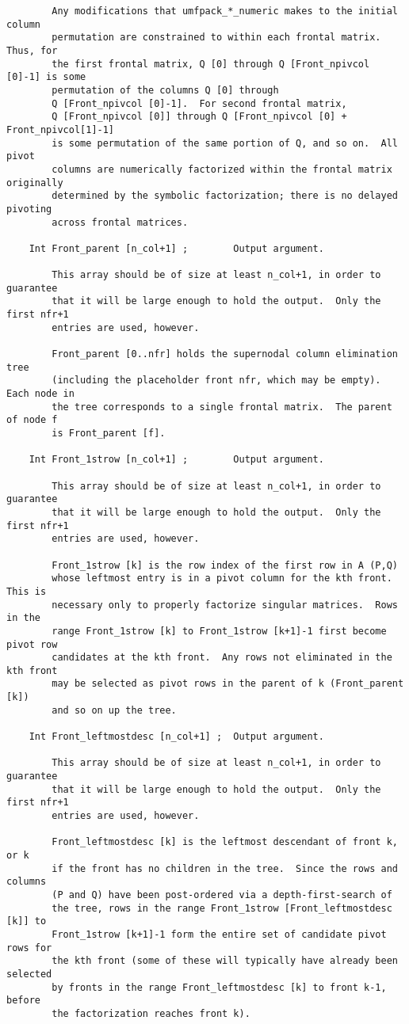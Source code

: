 \documentclass[11pt]{article}
\begin{document}
{\begin{verbatim}
        Any modifications that umfpack_*_numeric makes to the initial column
        permutation are constrained to within each frontal matrix.  Thus, for
        the first frontal matrix, Q [0] through Q [Front_npivcol [0]-1] is some
        permutation of the columns Q [0] through
        Q [Front_npivcol [0]-1].  For second frontal matrix,
        Q [Front_npivcol [0]] through Q [Front_npivcol [0] + Front_npivcol[1]-1]
        is some permutation of the same portion of Q, and so on.  All pivot
        columns are numerically factorized within the frontal matrix originally
        determined by the symbolic factorization; there is no delayed pivoting
        across frontal matrices.

    Int Front_parent [n_col+1] ;        Output argument.

        This array should be of size at least n_col+1, in order to guarantee
        that it will be large enough to hold the output.  Only the first nfr+1
        entries are used, however.

        Front_parent [0..nfr] holds the supernodal column elimination tree
        (including the placeholder front nfr, which may be empty).  Each node in
        the tree corresponds to a single frontal matrix.  The parent of node f
        is Front_parent [f].

    Int Front_1strow [n_col+1] ;        Output argument.

        This array should be of size at least n_col+1, in order to guarantee
        that it will be large enough to hold the output.  Only the first nfr+1
        entries are used, however.

        Front_1strow [k] is the row index of the first row in A (P,Q)
        whose leftmost entry is in a pivot column for the kth front.  This is
        necessary only to properly factorize singular matrices.  Rows in the
        range Front_1strow [k] to Front_1strow [k+1]-1 first become pivot row
        candidates at the kth front.  Any rows not eliminated in the kth front
        may be selected as pivot rows in the parent of k (Front_parent [k])
        and so on up the tree.

    Int Front_leftmostdesc [n_col+1] ;  Output argument.

        This array should be of size at least n_col+1, in order to guarantee
        that it will be large enough to hold the output.  Only the first nfr+1
        entries are used, however.

        Front_leftmostdesc [k] is the leftmost descendant of front k, or k
        if the front has no children in the tree.  Since the rows and columns
        (P and Q) have been post-ordered via a depth-first-search of
        the tree, rows in the range Front_1strow [Front_leftmostdesc [k]] to
        Front_1strow [k+1]-1 form the entire set of candidate pivot rows for
        the kth front (some of these will typically have already been selected
        by fronts in the range Front_leftmostdesc [k] to front k-1, before
        the factorization reaches front k).


\end{verbatim}}
\end{document}
